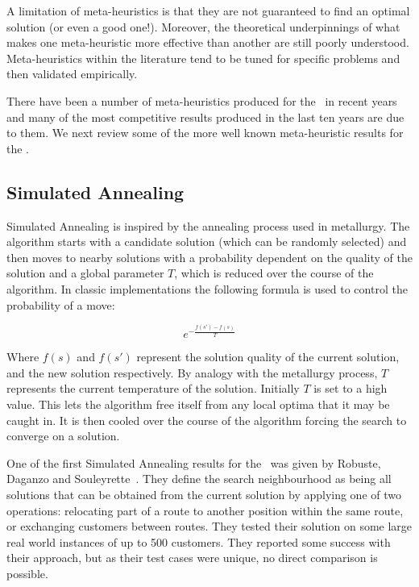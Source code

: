 
A limitation of meta-heuristics is that they are not guaranteed to find an optimal solution (or even a good one!). Moreover, the theoretical underpinnings of what makes one meta-heuristic more effective than another are still poorly understood. Meta-heuristics within the literature tend to be tuned for specific problems and then validated empirically.

There have been a number of meta-heuristics produced for the \VRP\ in recent years and many of the most competitive results produced in the last ten years are due to them. We next review some of the more well known meta-heuristic results for the \VRP.

\subsection{Simulated Annealing}

Simulated Annealing is inspired by the annealing process used in metallurgy. The algorithm starts with a candidate solution (which can be randomly selected) and then moves to nearby solutions with a probability dependent on the quality of the solution and a global parameter $T$, which is reduced over the course of the algorithm. In classic implementations the following formula is used to control the probability of a move: 

\[
e^{-\frac{f(s')-f(s)}{T}}
\]

Where $f(s)$ and $f(s')$ represent the solution quality of the current solution, and the new solution respectively. By analogy with the metallurgy process, $T$ represents the current temperature of the solution. Initially $T$ is set to a high value. This lets the algorithm free itself from any local optima that it may be caught in. It is then cooled over the course of the algorithm forcing the search to converge on a solution. 

One of the first Simulated Annealing results for the \VRP\ was given by Robuste, Daganzo and Souleyrette~\cite{RDS:1990}. They define the search neighbourhood as being all solutions that can be obtained from the current solution by applying one of two operations: relocating part of a route to another position within the same route, or exchanging customers between routes. They tested their solution on some large real world instances of up to 500 customers. They reported some success with their approach, but as their test cases were unique, no direct comparison is possible. 

